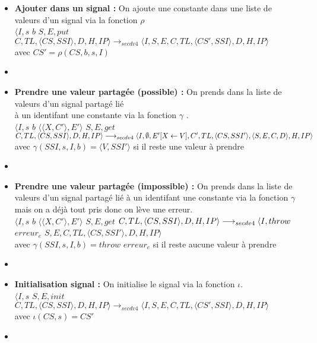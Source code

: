 \documentclass[10pt,a4paper]{article}
\begin{document}
\begin{enumerate}
\begin{itemize}
			    	\item[] \textbf{Ajouter dans un signal :} On ajoute une constante dans une liste de valeurs d'un signal via la fonction $\rho$
			    	\\$\langle I,s$ $b$ $S,E,put$ $C,TL,\langle CS,SSI\rangle,D,H,IP\rangle \longrightarrow_{secdv4} \langle I,S,E,C,TL,\langle CS',SSI\rangle,D,H,IP\rangle$ \\
			    	avec $CS' = \rho(CS,b,s,I)$
			    	\item[]
			    	
			    	\item[] \textbf{Prendre une valeur partagée (possible) :} On prends dans la liste de valeurs d'un signal partagé lié \\
			    	à un identifant une constante via la fonction $\gamma$ .
			    	\\$\langle I,s$ $b$ $\langle\langle X,C'\rangle,E'\rangle$ $S,E,get$ $C,TL,\langle CS,SSI\rangle,D,H,IP\rangle 
			    	\\\longrightarrow_{secdv4} \langle I,\emptyset,E'[X \leftarrow V],C',TL,\langle CS,SSI'\rangle,\langle S,E,C,D\rangle,H,IP\rangle$\\
			    	avec $ \gamma(SSI,s,I,b) = \langle V,SSI'\rangle$ si il reste une valeur à prendre
			    	\item[]
			    	
			    	\item[] \textbf{Prendre une valeur partagée (impossible) :} On prends dans la liste de valeurs d'un signal partagé lié à un identifant une constante via la fonction $\gamma$ mais on a déjà tout pris donc on lève une erreur.
			    	\\ $\langle I,s$ $b$ $\langle\langle X,C'\rangle,E'\rangle$ $S,E,get$ $C,TL,\langle CS,SSI\rangle,D,H,IP\rangle 
			    	\\\longrightarrow_{secdv4} \langle I,throw$ $erreur_{e}$ $S,E,C,TL,\langle CS,SSI'\rangle,D,H,IP\rangle$\\
			    	avec $ \gamma(SSI,s,I,b) = throw$ $erreur_{e}$ si il reste aucune valeur à prendre
			    	\item[]
			    	
			    	\item[] \textbf{Initialisation signal :} On initialise le signal via la fonction $\iota$.
			    	\\ $\langle I,s$ $S,E,init$ $C,TL,\langle CS,SSI\rangle,D,H,IP\rangle 
			    	\longrightarrow_{secdv4} \langle I,S,E,C,TL,\langle CS',SSI\rangle,D,H,IP\rangle$\\
			    	avec $\iota(CS,s) = CS'$
			    	\item[]	
			    	

\end{itemize}
\end{enumerate}
\end{document}
